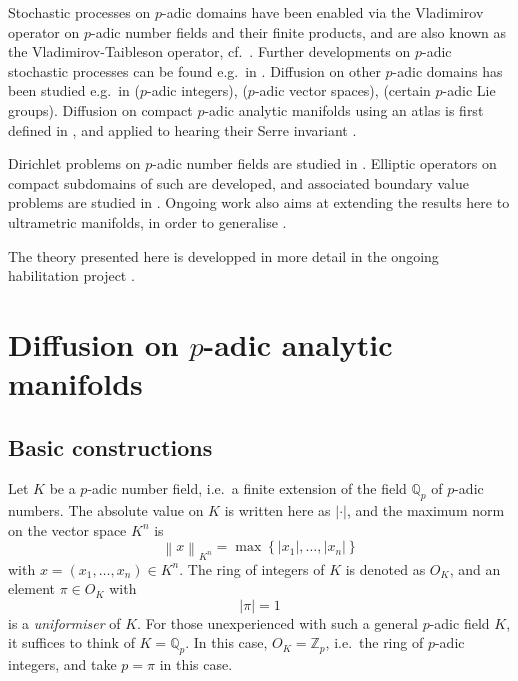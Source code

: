 \documentclass[a4paper,draft]{ZbRad}
\theoremstyle{plain}
\theoremstyle{definition}
\numberwithin{equation}{section}
\newcommand{\mathset}[1]{{\left\{#1\right\}}}
\newcommand{\absolute}[1]{\left\lvert#1\right\rvert}
\newcommand{\norm}[1]{\left\|#1\right\|}
\begin{document}
Stochastic processes on $p$-adic domains have been enabled via the Vladimirov operator on $p$-adic number fields and their finite products, and are also known as the Vladimirov-Taibleson operator, cf.\ \cite{VVZ1994,RZ2008}. Further developments on $p$-adic stochastic processes can be found e.g.\ in \cite{Kochubei2001,Zuniga2025}.
Diffusion on other $p$-adic domains has been studied e.g.\ in \cite{PRSW2024} ($p$-adic integers), \cite{PW2025} ($p$-adic vector spaces), 
\cite{RodriguezDiss,Rodriguez2025} (certain $p$-adic Lie groups).
Diffusion on compact $p$-adic analytic manifolds using an atlas is first defined in \cite{DiffMfp}, and applied to hearing their Serre invariant \cite{HearingSerre}. 
\newline

Dirichlet problems on $p$-adic number fields are studied in 
\cite{Kochubei2023}. Elliptic operators on compact subdomains of such are developed, and associated boundary value problems are studied in \cite{ellipticBVP}. Ongoing work also aims at extending the results here to ultrametric manifolds, in order to generalise \cite{VPZeta}.
\newline

The theory presented here is developped in more detail in the ongoing habilitation project \cite{diff_AMf_p}.


\section{Diffusion on $p$-adic analytic manifolds}

\subsection{Basic constructions}

Let $K$ be a $p$-adic number field, i.e.\ a finite extension of the field $\mathbb{Q}_p$ of $p$-adic numbers. The absolute value on $K$ is written here as $\absolute{\cdot}$, and the maximum norm on the vector space $K^n$ is
\[
\norm{x}_{K^n}=\max\mathset{\absolute{x_1},\dots,\absolute{x_n}}
\]
with $x=(x_1,\dots,x_n)\in K^n$.
The ring of integers of $K$ is denoted as $O_K$, and an element $\pi\in O_K$ with
\[
\absolute{\pi}=1
\]
is a \emph{uniformiser} of $K$.
For those unexperienced with such a general $p$-adic field $K$, it suffices to think of $K=\mathbb{Q}_p$. In this case, $O_K=\mathbb{Z}_p$, i.e.\ the ring of $p$-adic integers, and take $p=\pi$ in this case.
\newline
\end{document}
